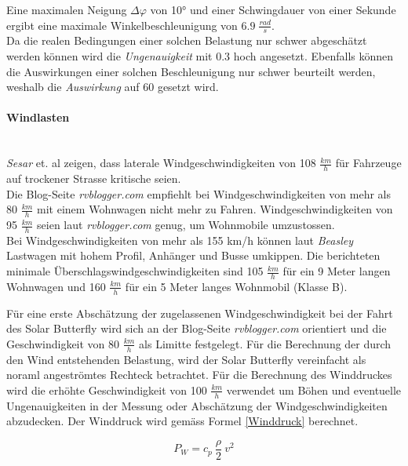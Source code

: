 \begin{description}
    Eine maximalen Neigung $\Delta \varphi$ von 10° und einer Schwingdauer von einer Sekunde ergibt eine maximale Winkelbeschleunigung von $6.9 \; \frac{rad}{s}$.\\
    Da die realen Bedingungen einer solchen Belastung nur schwer abgeschätzt werden können wird die \emph{Ungenauigkeit} mit 0.3 hoch angesetzt. Ebenfalls können die Auswirkungen einer solchen Beschleunigung nur schwer beurteilt werden, weshalb die \emph{Auswirkung} auf 60 gesetzt wird.
  \end{description}

  \paragraph{Windlasten}\mbox{}\\
  \emph{Sesar} et. al \cite{Wind.1} zeigen, dass laterale Windgeschwindigkeiten von 108 $\frac{km}{h}$ für Fahrzeuge auf trockener Strasse kritische seien.\\
  Die Blog-Seite \emph{rvblogger.com} \cite{Wind.2} empfiehlt bei Windgeschwindigkeiten von mehr als 80 $\frac{km}{h}$ mit einem Wohnwagen nicht mehr zu Fahren. Windgeschwindigkeiten von 95 $\frac{km}{h}$ seien laut \emph{rvblogger.com} genug, um Wohnmobile umzustossen.\\
  Bei Windgeschwindigkeiten von mehr als 155 km/h können laut \emph{Beasley} \cite{Wind.3} Lastwagen mit hohem Profil, Anhänger und Busse umkippen. Die berichteten minimale Überschlagswindgeschwindigkeiten sind 105 $\frac{km}{h}$ für ein 9 Meter langen Wohnwagen und 160 $\frac{km}{h}$ für ein 5 Meter langes Wohnmobil (Klasse B).

  Für eine erste Abschätzung der zugelassenen Windgeschwindigkeit bei der Fahrt des Solar Butterfly wird sich an der Blog-Seite \emph{rvblogger.com} orientiert und die Geschwindigkeit von 80 $\frac{km}{h}$ als Limitte festgelegt. Für die Berechnung der durch den Wind entstehenden Belastung, wird der Solar Butterfly vereinfacht als noraml angeströmtes Rechteck betrachtet. Für die Berechnung des Winddruckes wird die erhöhte Geschwindigkeit von 100 $\frac{km}{h}$ verwendet um Böhen und eventuelle Ungenauigkeiten in der Messung oder Abschätzung der Windgeschwindigkeiten abzudecken. Der Winddruck wird gemäss Formel \ref{Winddruck} berechnet.

  \begin{equation}
    \label{Winddruck}
    P_W = c_p \: \frac{\rho}{2}\: v^2
  \end{equation}

